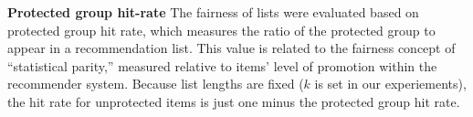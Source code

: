         \textbf{Protected group hit-rate}
        The fairness of lists were evaluated based on protected group hit rate, which measures the ratio of the protected group to appear in a recommendation list. This value is related to the fairness concept of ``statistical parity,'' measured relative to items' level of promotion within the recommender system. Because list lengths are fixed ($k$ is set in our experiements), the hit rate for unprotected items is just one minus the protected group hit rate. 
        
    
        
        
        
        
    
        
